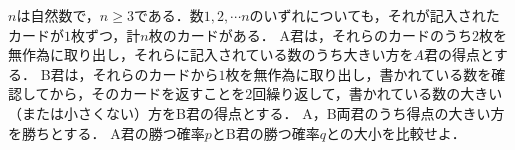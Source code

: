 \documentclass[../../main.tex]{subfiles}
\begin{document}
$n$は自然数で，$n\ge 3$である．数$1, 2,\cdots n$のいずれについても，それが記入されたカードが$1$枚ずつ，計$n$枚のカードがある．
A君は，それらのカードのうち$2$枚を無作為に取り出し，それらに記入されている数のうち大きい方を$A$君の得点とする．
B君は，それらのカードから$1$枚を無作為に取り出し，書かれている数を確認してから，そのカードを返すことを$2$回繰り返して，書かれている数の大きい（または小さくない）方をB君の得点とする．
A，B両君のうち得点の大きい方を勝ちとする．
A君の勝つ確率$p$とB君の勝つ確率$q$との大小を比較せよ．
\end{document}
